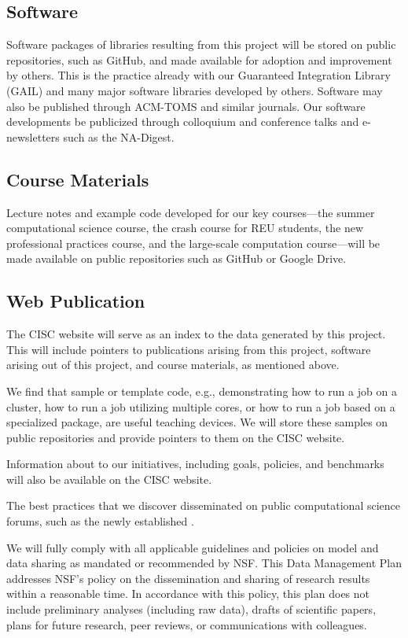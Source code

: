 \documentclass[11pt]{NSFamsart}
\begin{document}
\subsection*{Software}
Software packages of libraries resulting from this project will be stored on public repositories, such as GitHub, and made available for adoption and improvement by others.  This is the practice already with our Guaranteed
Integration Library (GAIL) \cite{ChoEtal17b} and many major software libraries developed by others.  Software may also be published through ACM-TOMS and similar journals. Our software developments be publicized through colloquium and 
conference talks and e-newsletters such as the NA-Digest.

\subsection*{Course Materials} Lecture notes and example code developed for our key courses---the summer computational science course, the crash course for REU students, the new professional practices course, and the large-scale computation course---will be made available on public repositories such as GitHub or Google Drive.


\subsection*{Web Publication} The CISC website will serve as an index to the data generated by this project.  This will include pointers to publications arising from this project, software arising out of this project, and course materials, as mentioned above.  

We find that sample or template code, e.g., demonstrating how to run a job on a cluster, how to run a job utilizing multiple cores, or how to run a job based on a specialized package, are useful teaching devices.  We will store these samples on public repositories and provide pointers to them on the CISC website.

Information about to our initiatives, including goals, policies, and benchmarks will also be available on the CISC website.

The best practices that we discover disseminated on public computational science forums, such as the newly established \cite{BSS18}.


\bigskip
\noindent
We will fully comply with all applicable guidelines and policies on model and data sharing as mandated or recommended by NSF.
This Data Management Plan addresses NSF’s policy on the dissemination and sharing of research results within a reasonable time.  In accordance with this policy, this plan does not include preliminary analyses (including raw data), drafts of scientific papers, plans for future research, peer reviews, or communications with colleagues. 
\end{document}
